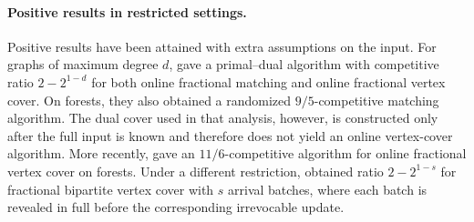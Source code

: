 \paragraph{Positive results in restricted settings.}
Positive results have been attained with extra assumptions on the input. For graphs of maximum degree $d$, \citet{BuchbinderSegevTkach17} gave a primal--dual algorithm with competitive ratio $2-2^{1-d}$ for both online fractional matching and online fractional vertex cover. On forests, they also obtained a randomized $9/5$-competitive matching algorithm. The dual cover used in that analysis, however, is constructed only after the full input is known and therefore does not yield an online vertex-cover algorithm. More recently, \citet{BaligacsEtAl26} gave an $11/6$-competitive algorithm for online fractional vertex cover on forests. Under a different restriction, \citet{LeeSingla20} obtained ratio $2-2^{1-s}$ for fractional bipartite vertex cover with $s$ arrival batches, where each batch is revealed in full before the corresponding irrevocable update.


